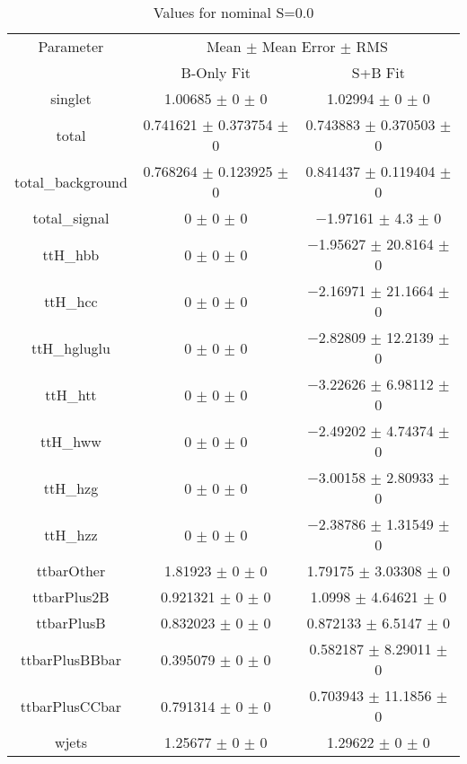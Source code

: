\begin{table}
\centering
\caption{Values for nominal S=0.0}
\begin{tabular}{ccc}
\toprule
Parameter & \multicolumn{2}{c}{Mean $\pm$ Mean Error $\pm$ RMS}\\
 & B-Only Fit & S+B Fit\\
\midrule
singlet & \num{1.00685} $\pm$ \num{0} $\pm$ \num{0} & \num{1.02994} $\pm$ \num{0} $\pm$ \num{0}\\
total & \num{0.741621} $\pm$ \num{0.373754} $\pm$ \num{0} & \num{0.743883} $\pm$ \num{0.370503} $\pm$ \num{0}\\
total\_background & \num{0.768264} $\pm$ \num{0.123925} $\pm$ \num{0} & \num{0.841437} $\pm$ \num{0.119404} $\pm$ \num{0}\\
total\_signal & \num{0} $\pm$ \num{0} $\pm$ \num{0} & \num{-1.97161} $\pm$ \num{4.3} $\pm$ \num{0}\\
ttH\_hbb & \num{0} $\pm$ \num{0} $\pm$ \num{0} & \num{-1.95627} $\pm$ \num{20.8164} $\pm$ \num{0}\\
ttH\_hcc & \num{0} $\pm$ \num{0} $\pm$ \num{0} & \num{-2.16971} $\pm$ \num{21.1664} $\pm$ \num{0}\\
ttH\_hgluglu & \num{0} $\pm$ \num{0} $\pm$ \num{0} & \num{-2.82809} $\pm$ \num{12.2139} $\pm$ \num{0}\\
ttH\_htt & \num{0} $\pm$ \num{0} $\pm$ \num{0} & \num{-3.22626} $\pm$ \num{6.98112} $\pm$ \num{0}\\
ttH\_hww & \num{0} $\pm$ \num{0} $\pm$ \num{0} & \num{-2.49202} $\pm$ \num{4.74374} $\pm$ \num{0}\\
ttH\_hzg & \num{0} $\pm$ \num{0} $\pm$ \num{0} & \num{-3.00158} $\pm$ \num{2.80933} $\pm$ \num{0}\\
ttH\_hzz & \num{0} $\pm$ \num{0} $\pm$ \num{0} & \num{-2.38786} $\pm$ \num{1.31549} $\pm$ \num{0}\\
ttbarOther & \num{1.81923} $\pm$ \num{0} $\pm$ \num{0} & \num{1.79175} $\pm$ \num{3.03308} $\pm$ \num{0}\\
ttbarPlus2B & \num{0.921321} $\pm$ \num{0} $\pm$ \num{0} & \num{1.0998} $\pm$ \num{4.64621} $\pm$ \num{0}\\
ttbarPlusB & \num{0.832023} $\pm$ \num{0} $\pm$ \num{0} & \num{0.872133} $\pm$ \num{6.5147} $\pm$ \num{0}\\
ttbarPlusBBbar & \num{0.395079} $\pm$ \num{0} $\pm$ \num{0} & \num{0.582187} $\pm$ \num{8.29011} $\pm$ \num{0}\\
ttbarPlusCCbar & \num{0.791314} $\pm$ \num{0} $\pm$ \num{0} & \num{0.703943} $\pm$ \num{11.1856} $\pm$ \num{0}\\
wjets & \num{1.25677} $\pm$ \num{0} $\pm$ \num{0} & \num{1.29622} $\pm$ \num{0} $\pm$ \num{0}\\
\bottomrule
\end{tabular}
\end{table}